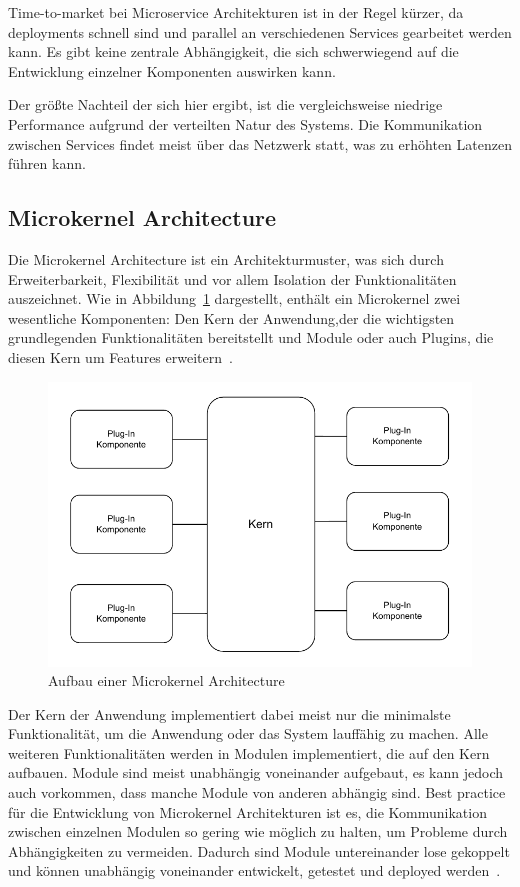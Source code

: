\documentclass[acmtog]{acmart}
\begin{document}
Time-to-market bei Microservice Architekturen ist in der Regel kürzer, da deployments schnell sind und parallel an verschiedenen Services gearbeitet werden kann.
Es gibt keine zentrale Abhängigkeit, die sich schwerwiegend auf die Entwicklung einzelner Komponenten auswirken kann.

Der größte Nachteil der sich hier ergibt, ist die vergleichsweise niedrige Performance aufgrund der verteilten Natur des Systems.
Die Kommunikation zwischen Services findet meist über das Netzwerk statt, was zu erhöhten Latenzen führen kann\cite[34]{architecturePatterns}.


\subsection{Microkernel Architecture}\label{subsec:microkernel-architecture}
Die Microkernel Architecture ist ein Architekturmuster, was sich durch Erweiterbarkeit, Flexibilität und vor allem Isolation der Funktionalitäten auszeichnet.
Wie in Abbildung~\ref{fig:microkernel} dargestellt, enthält ein Microkernel zwei wesentliche Komponenten: Den Kern der Anwendung,der die wichtigsten grundlegenden Funktionalitäten bereitstellt und Module oder auch Plugins,
die diesen Kern um Features erweitern~\cite[21-22]{architecturePatterns}.

\begin{figure}[!h]
  \centering
  \includegraphics[width=\linewidth]{images/microkernel/microkernel}
  \caption{Aufbau einer Microkernel Architecture}
  \label{fig:microkernel}
\end{figure}

Der Kern der Anwendung implementiert dabei meist nur die minimalste Funktionalität, um die Anwendung oder das System lauffähig zu machen.
Alle weiteren Funktionalitäten werden in Modulen implementiert, die auf den Kern aufbauen.
Module sind meist unabhängig voneinander aufgebaut, es kann jedoch auch vorkommen, dass manche Module von anderen abhängig sind.
Best practice für die Entwicklung von Microkernel Architekturen ist es, die Kommunikation zwischen einzelnen Modulen so gering wie möglich zu halten, um Probleme durch Abhängigkeiten zu vermeiden.
Dadurch sind Module untereinander lose gekoppelt und können unabhängig voneinander entwickelt, getestet und deployed werden~\cite[22]{architecturePatterns}.
\end{document}
